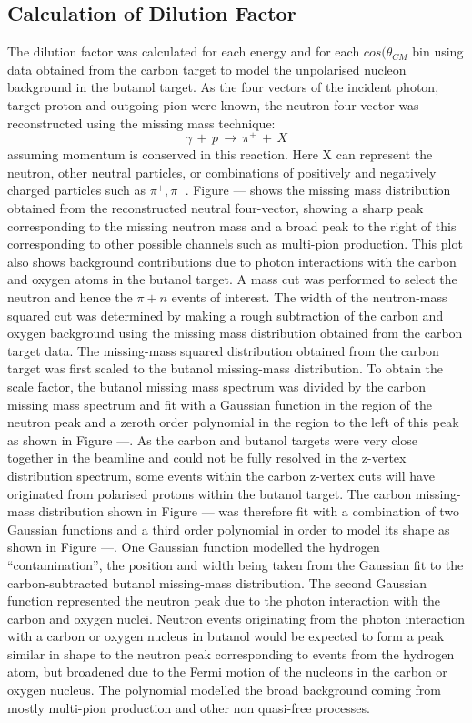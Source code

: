 \subsection{Calculation of Dilution Factor}
The dilution factor was calculated for each energy and for each $cos(\theta_{CM}$ bin using data obtained from the carbon target to model the unpolarised nucleon background in the butanol target.
As the four vectors of the incident photon, target proton and outgoing pion were known, the neutron four-vector was reconstructed using the missing mass technique:
$$
\gamma \, + \,  p \, \rightarrow \, \pi^+ \, + \, X
$$
assuming momentum is conserved in this reaction. Here X can represent the neutron, other neutral particles, or combinations of positively and negatively charged particles such as $\pi^+ , \pi^-$. Figure --- shows the missing mass distribution obtained from the reconstructed neutral four-vector, showing a sharp peak corresponding to the missing neutron mass and a broad peak to the right of this corresponding to other possible channels such as multi-pion production. This plot also shows background contributions due to photon interactions with the carbon and oxygen atoms in the butanol target.
A mass cut was performed to select the neutron and hence the $\pi + n$ events of interest. The width of the neutron-mass squared cut was determined by making a rough subtraction of the carbon and oxygen background using the missing mass distribution obtained from the carbon target data. The missing-mass squared distribution obtained from the carbon target was first scaled to the butanol missing-mass distribution. To obtain the scale factor, the butanol missing mass spectrum was divided by the carbon missing mass spectrum and fit with a Gaussian function in the region of the neutron peak and a zeroth order polynomial in the region to the left of this peak as shown in Figure ---.
As the carbon and butanol targets were very close together in the beamline and could not be fully resolved in the z-vertex distribution spectrum, some events within the carbon z-vertex cuts will have originated from polarised protons within the butanol target.
The carbon missing-mass distribution shown in Figure --- was therefore fit with a combination of two Gaussian functions and a third order polynomial in order to model its shape as shown in Figure ---. One Gaussian function modelled the hydrogen “contamination”, the position and width being taken from the Gaussian fit to the carbon-subtracted butanol missing-mass distribution. The second Gaussian function represented the neutron peak due to the photon interaction with the carbon and oxygen nuclei. Neutron events originating from the photon interaction with a carbon or oxygen nucleus in butanol would be expected to form a peak similar in shape to the neutron peak corresponding to events from the hydrogen atom, but broadened due to the Fermi motion of the nucleons in the carbon or oxygen nucleus. The polynomial modelled the broad background coming from mostly multi-pion production and other non quasi-free processes.
